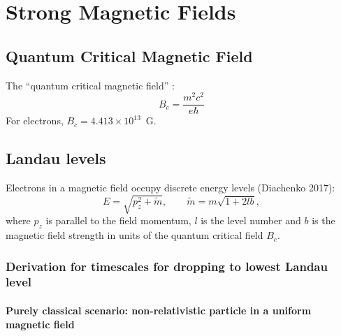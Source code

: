 \documentclass{book}
\begin{document}
\chapter{Strong Magnetic Fields}

\section{Quantum Critical Magnetic Field}

The ``quantum critical magnetic field'' \citep[translated to SI units from][]{Diachenko2017}:
\begin{equation}
    B_c = \frac{m^2c^2}{e\hbar}
\end{equation}
For electrons, $B_c = 4.413\times10^{13}\,$ G.

\section{Landau levels}

Electrons in a magnetic field occupy discrete energy levels (Diachenko 2017):
\begin{equation}
    E = \sqrt{p_z^2 + \tilde{m}},
    \qquad
    \tilde{m} = m\sqrt{1 + 2lb},
\end{equation}
where $p_z$ is parallel to the field momentum, $l$ is the level number and $b$ is the magnetic field strength in units of the quantum critical field $B_c$.

\subsection{Derivation for timescales for dropping to lowest Landau level}

\subsubsection{Purely classical scenario: non-relativistic particle in a uniform magnetic field}
\end{document}
